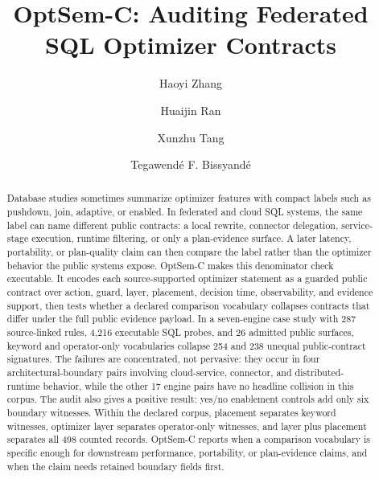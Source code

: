 \documentclass[sigconf, nonacm]{acmart}
\title{OptSem-C: Auditing Federated SQL Optimizer Contracts}
\author{Haoyi Zhang}
\affiliation{%
  \institution{Xi'an Jiaotong-Liverpool University}
  \city{Suzhou}
  \country{China}
}
\author{Huaijin Ran}
\affiliation{%
  \institution{Nanyang Technological University}
  \city{Singapore}
  \country{Singapore}
}
\author{Xunzhu Tang}
\affiliation{%
  \institution{University of Luxembourg}
  \city{Luxembourg}
  \country{Luxembourg}
}
\author{Tegawend\'e F. Bissyand\'e}
\affiliation{%
  \institution{University of Luxembourg}
  \city{Luxembourg}
  \country{Luxembourg}
}
\begin{document}
\begin{abstract}
Database studies sometimes summarize optimizer features with compact labels such as pushdown, join, adaptive, or enabled.  In federated and cloud SQL systems, the same label can name different public contracts: a local rewrite, connector delegation, service-stage execution, runtime filtering, or only a plan-evidence surface.  A later latency, portability, or plan-quality claim can then compare the label rather than the optimizer behavior the public systems expose.  OptSem-C makes this denominator check executable.  It encodes each source-supported optimizer statement as a guarded public contract over action, guard, layer, placement, decision time, observability, and evidence support, then tests whether a declared comparison vocabulary collapses contracts that differ under the full public evidence payload.  In a seven-engine case study with 287 source-linked rules, 4,216 executable SQL probes, and 26 admitted public surfaces, keyword and operator-only vocabularies collapse 254 and 238 unequal public-contract signatures.  The failures are concentrated, not pervasive: they occur in four architectural-boundary pairs involving cloud-service, connector, and distributed-runtime behavior, while the other 17 engine pairs have no headline collision in this corpus.  The audit also gives a positive result: yes/no enablement controls add only six boundary witnesses.  Within the declared corpus, placement separates keyword witnesses, optimizer layer separates operator-only witnesses, and layer plus placement separates all 498 counted records.  OptSem-C reports when a comparison vocabulary is specific enough for downstream performance, portability, or plan-evidence claims, and when the claim needs retained boundary fields first.
\end{abstract}

\maketitle
\end{document}
